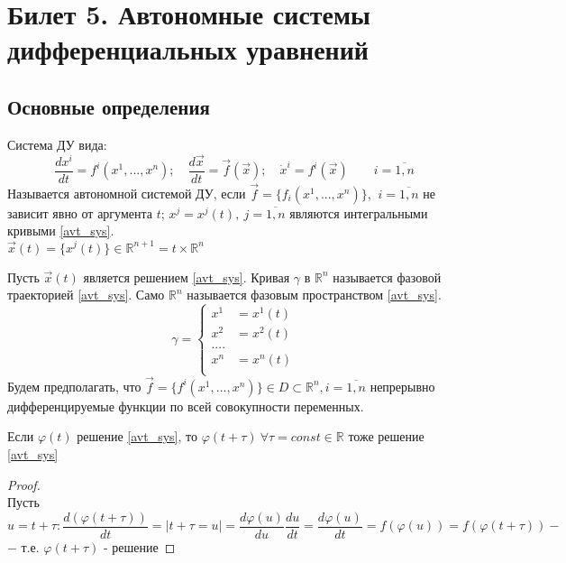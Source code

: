 



	\section{Билет 5. Автономные системы дифференциальных уравнений}
	\subsection{Основные определения}
	Система ДУ вида: 
	\begin{equation}\label{avt_sys}
		\frac{dx^i}{dt} = f^i(x^1, ..., x^n); \quad \frac{d\vec{x}}{dt} = \vec{f}(\vec{x}); \quad \dot{x}^i = f^i(\vec{x}) \quad \quad i = \overline{1, n}
	\end{equation}
	Называется автономной системой ДУ, если $ \vec{f} = \{f_i(x^1, ..., x^n)\} $,  $\ i = \overline{1, n}$ не зависит явно от аргумента $ t $; $ x^j = x^j(t), \ j = \overline{1, n} $ являются интегральными кривыми \eqref{avt_sys}. \\ $\vec{x}(t) = \{ x^j(t) \} \in \mathbb{R}^{n+1} = t \times \mathbb{R}^n$
	\begin{definition}
		Пусть $ \vec{x}(t) $ является решением \eqref{avt_sys}. Кривая $ \gamma $ в $ \mathbb{R}^n $ называется фазовой траекторией \eqref{avt_sys}. Само $ \mathbb{R}^n $ называется фазовым пространством \eqref{avt_sys}.
		\begin{equation}\label{gamma_sys}
			\gamma = \left\{
				\begin{aligned}
					x^1 &= x^1(t) \\
					x^2 &=x^2(t) \\
					.... \\
					x^n &= x^n(t) \\
				\end{aligned}
			\right.
		\end{equation}
		Будем предполагать, что $ \vec{f} = \{ f^i(x^1, ..., x^n) \} \in D \subset \mathbb{R}^n, i = \overline{1, n} $ непрерывно дифференцируемые функции по всей совокупности переменных.
	\end{definition}

	\begin{theorem}
		Если $ \varphi(t) $ решение \eqref{avt_sys}, то $ \varphi(t + \tau) \ \forall \tau = const \in \mathbb{R}$ тоже решение \eqref{avt_sys}
	\end{theorem}

	\begin{proof}
		\ \\
		Пусть $ u = t + \tau: \dfrac{d(\varphi(t + \tau))}{dt} = | t + \tau = u | = \dfrac{d \varphi(u)}{du} \dfrac{du}{dt} = \dfrac{d \varphi(u)}{dt} = f(\varphi(u)) = f(\varphi(t + \tau))-$ \\ $-$ т.е. $\varphi(t + \tau)$ - решение
	\end{proof}

